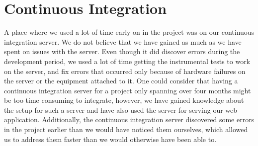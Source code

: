 
\section{Continuous Integration}
A place where we used a lot of time early on in the project was on our continuous integration server. We do not believe that we have gained as much as we have spent on issues with the server. Even though it did discover errors during the development period, we used a lot of time getting the instrumental tests to work on the server, and fix errors that occurred only because of hardware failures on the server or the equipment attached to it. One could consider that having a continuous integration server for a project only spanning over four months might be too time consuming to integrate, however, we have gained knowledge about the setup for such a server and have also used the server for serving our web application. Additionally, the continuous integration server discovered some errors in the project earlier than we would have noticed them ourselves, which allowed us to address them faster than we would otherwise have been able to. 